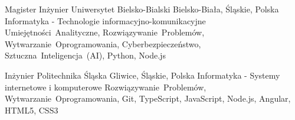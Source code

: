 
\begin{cventries}

  \cventry
    {Magister Inżynier} %
    {Uniwersytet Bielsko-Bialski} %
    {Bielsko-Biała, Śląskie, Polska} %
    {} %
    {Informatyka - Technologie informacyjno-komunikacyjne}
    {Umiejętności~Analityczne, Rozwiązywanie~Problemów, Wytwarzanie~Oprogramowania, Cyberbezpieczeństwo, Sztuczna~Inteligencja~(AI), Python, Node.js}

  \cventry
    {Inżynier} %
    {Politechnika Śląska} %
    {Gliwice, Śląskie, Polska} %
    {} %
    {Informatyka - Systemy internetowe i komputerowe}
    {Rozwiązywanie~Problemów, Wytwarzanie~Oprogramowania, Git, TypeScript, JavaScript, Node.js, Angular, HTML5, CSS3}

\end{cventries}
